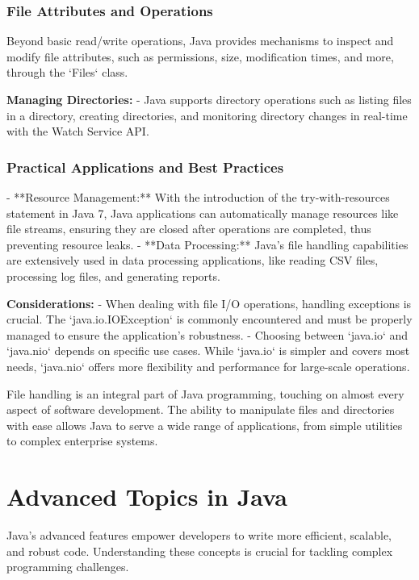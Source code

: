 \documentclass{article}
\begin{document}
\subsubsection{File Attributes and Operations}
Beyond basic read/write operations, Java provides mechanisms to inspect and modify file attributes, such as permissions, size, modification times, and more, through the `Files` class.

\textbf{Managing Directories:}
- Java supports directory operations such as listing files in a directory, creating directories, and monitoring directory changes in real-time with the Watch Service API.

\subsubsection{Practical Applications and Best Practices}
- **Resource Management:** With the introduction of the try-with-resources statement in Java 7, Java applications can automatically manage resources like file streams, ensuring they are closed after operations are completed, thus preventing resource leaks.
- **Data Processing:** Java's file handling capabilities are extensively used in data processing applications, like reading CSV files, processing log files, and generating reports.

\textbf{Considerations:}
- When dealing with file I/O operations, handling exceptions is crucial. The `java.io.IOException` is commonly encountered and must be properly managed to ensure the application's robustness.
- Choosing between `java.io` and `java.nio` depends on specific use cases. While `java.io` is simpler and covers most needs, `java.nio` offers more flexibility and performance for large-scale operations.

File handling is an integral part of Java programming, touching on almost every aspect of software development. The ability to manipulate files and directories with ease allows Java to serve a wide range of applications, from simple utilities to complex enterprise systems.



\newpage
\section{Advanced Topics in Java}
Java's advanced features empower developers to write more efficient, scalable, and robust code. Understanding these concepts is crucial for tackling complex programming challenges.
\end{document}
